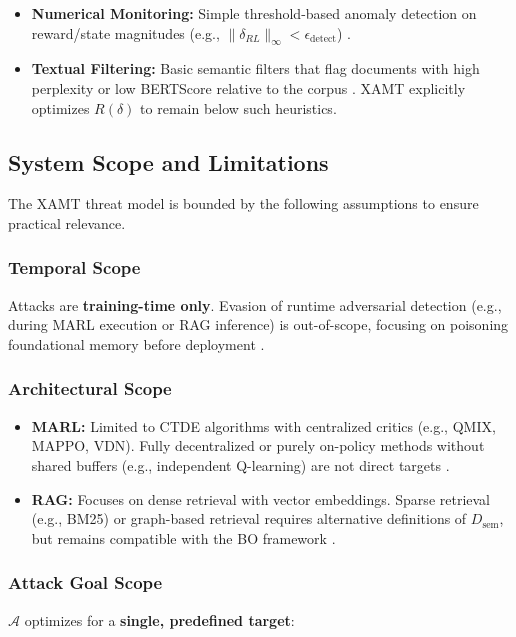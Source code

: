 \documentclass[conference]{IEEEtran}
\begin{document}
\begin{itemize}
\item \textbf{Numerical Monitoring:} Simple threshold-based anomaly detection on reward/state magnitudes (e.g., $ \|\delta_{RL}\|_{\infty} < \epsilon_{\text{detect}}$) \cite{Ref24}.
\item \textbf{Textual Filtering:} Basic semantic filters that flag documents with high perplexity or low BERTScore relative to the corpus \cite{Ref29, Ref37}. XAMT explicitly optimizes $R(\delta)$ to remain below such heuristics.
\end{itemize}

\subsection{System Scope and Limitations}
The XAMT threat model is bounded by the following assumptions to ensure practical relevance.

\subsubsection{Temporal Scope}
Attacks are \textbf{training-time only}. Evasion of runtime adversarial detection (e.g., during MARL execution or RAG inference) is out-of-scope, focusing on poisoning foundational memory before deployment \cite{Ref13, Ref25}.

\subsubsection{Architectural Scope}
\begin{itemize}
\item \textbf{MARL:} Limited to CTDE algorithms with centralized critics (e.g., QMIX, MAPPO, VDN). Fully decentralized or purely on-policy methods without shared buffers (e.g., independent Q-learning) are not direct targets \cite{Ref6, Ref10}.
\item \textbf{RAG:} Focuses on dense retrieval with vector embeddings. Sparse retrieval (e.g., BM25) or graph-based retrieval requires alternative definitions of $D_{\text{sem}}$, but remains compatible with the BO framework \cite{Ref42, Ref48}.
\end{itemize}

\subsubsection{Attack Goal Scope}
$\mathcal{A}$ optimizes for a \textbf{single, predefined target}:
\end{document}
